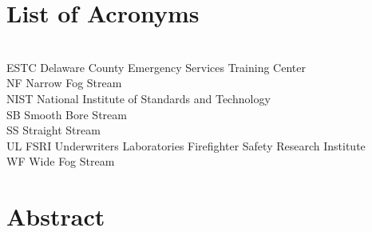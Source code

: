 \documentclass[12pt,oneside]{book}
\begin{document}
\cleardoublepage
{}
{}
\tableofcontents

\cleardoublepage
{}
{}
\listoffigures

\cleardoublepage
{}
{}
\listoftables

\chapter{List of Acronyms}

\begin{tabbing}
\hspace{1.5in} \= \\
ESTC \> Delaware County Emergency Services Training Center \\
NF \> Narrow Fog Stream\\
NIST \> National Institute of Standards and Technology \\
SB \> Smooth Bore Stream\\
SS \> Straight Stream \\
UL FSRI \> Underwriters Laboratories Firefighter Safety Research Institute \\
WF \> Wide Fog Stream \\
\end{tabbing}

\newpage


\mainmatter


\chapter*{\centering Abstract}
\end{document}
